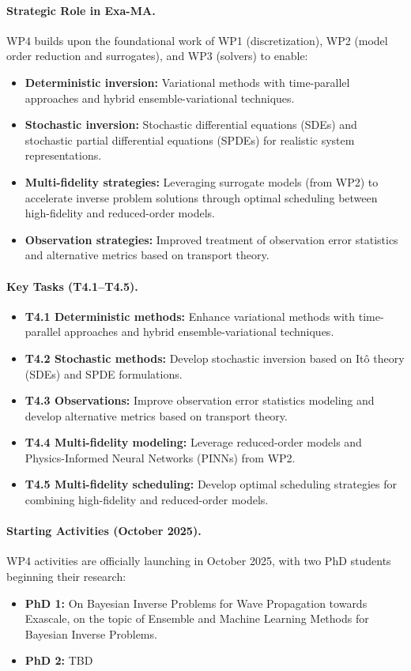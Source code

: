 \paragraph{Strategic Role in Exa-MA.}
WP4 builds upon the foundational work of WP1 (discretization), WP2 (model order reduction and surrogates), and WP3 (solvers) to enable:
\begin{itemize}
\item \textbf{Deterministic inversion:} Variational methods with time-parallel approaches and hybrid ensemble-variational techniques.
\item \textbf{Stochastic inversion:} Stochastic differential equations (SDEs) and stochastic partial differential equations (SPDEs) for realistic system representations.
\item \textbf{Multi-fidelity strategies:} Leveraging surrogate models (from WP2) to accelerate inverse problem solutions through optimal scheduling between high-fidelity and reduced-order models.
\item \textbf{Observation strategies:} Improved treatment of observation error statistics and alternative metrics based on transport theory.
\end{itemize}

\paragraph{Key Tasks (T4.1--T4.5).}
\begin{itemize}
\item \textbf{T4.1 Deterministic methods:} Enhance variational methods with time-parallel approaches and hybrid ensemble-variational techniques.
\item \textbf{T4.2 Stochastic methods:} Develop stochastic inversion based on Itô theory (SDEs) and SPDE formulations.
\item \textbf{T4.3 Observations:} Improve observation error statistics modeling and develop alternative metrics based on transport theory.
\item \textbf{T4.4 Multi-fidelity modeling:} Leverage reduced-order models and Physics-Informed Neural Networks (PINNs) from WP2.
\item \textbf{T4.5 Multi-fidelity scheduling:} Develop optimal scheduling strategies for combining high-fidelity and reduced-order models.
\end{itemize}

\paragraph{Starting Activities (October 2025).}
WP4 activities are officially launching in October 2025, with two PhD students beginning their research:
\begin{itemize}
\item \textbf{PhD 1:} On Bayesian Inverse Problems for Wave Propagation towards Exascale, on the topic of Ensemble and Machine Learning Methods for Bayesian Inverse Problems. 
\item \textbf{PhD 2:} TBD 
\end{itemize}

